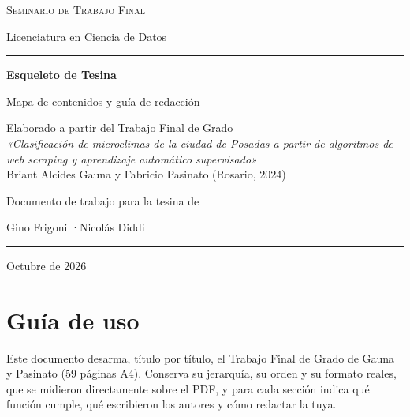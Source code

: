 \documentclass[12pt,a4paper,oneside]{report}
\begin{document}
\begin{titlepage}
  \begin{center}
    {\large\scshape Seminario de Trabajo Final\par}
    \vspace{2pt}
    {\large Licenciatura en Ciencia de Datos\par}
    \vspace{1.2cm}
    {\color{gris}\rule{\linewidth}{0.6pt}}\par
    \vspace{1.2cm}
    {\Huge\bfseries Esqueleto de Tesina\par}
    \vspace{0.6cm}
    {\Large Mapa de contenidos y guía de redacción\par}
    \vspace{1.2cm}
    \begin{minipage}{0.86\linewidth}
      \centering\normalsize
      Elaborado a partir del Trabajo Final de Grado\\[4pt]
      \textit{«Clasificación de microclimas de la ciudad de Posadas a partir de
      algoritmos de web scraping y aprendizaje automático supervisado»}\\[4pt]
      Briant Alcides Gauna y Fabricio Pasinato (Rosario, 2024)
    \end{minipage}
    \vfill
    {\large Documento de trabajo para la tesina de\par}
    \vspace{6pt}
    {\Large Gino Frigoni \quad·\quad Nicolás Diddi\par}
    \vspace{1.6cm}
    {\color{gris}\rule{\linewidth}{0.6pt}}\par
    \vspace{6pt}
    {\large Octubre de 2026\par}
  \end{center}
\end{titlepage}

\setcounter{page}{2}

\chapter*{Guía de uso}

Este documento desarma, título por título, el Trabajo Final de Grado de Gauna y
Pasinato (59 páginas A4). Conserva su jerarquía, su orden y su formato reales, que se
midieron directamente sobre el PDF, y para cada sección indica qué función cumple, qué
escribieron los autores y cómo redactar la tuya.
\end{document}
